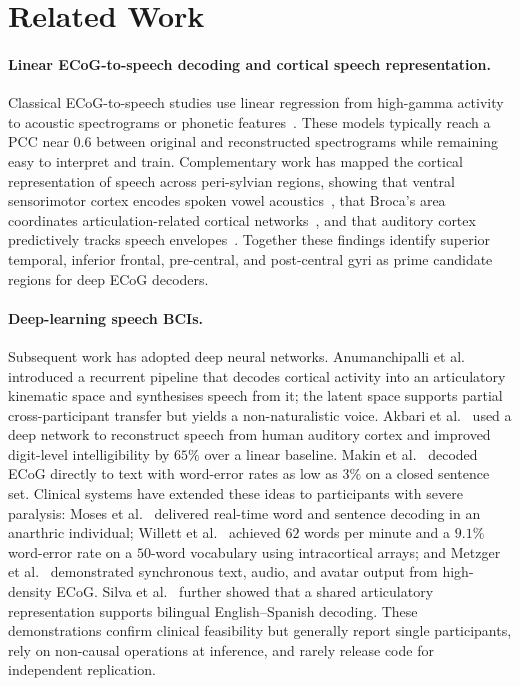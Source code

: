 \documentclass[11pt]{article}
\begin{document}
\section{Related Work}

\paragraph{Linear ECoG-to-speech decoding and cortical speech representation.}
Classical ECoG-to-speech studies use linear regression from high-gamma
activity to acoustic spectrograms or phonetic
features~\cite{pasley2012reconstructing,mugler2014direct,herff2015brain}.
These models typically reach a PCC near $0.6$ between original and
reconstructed spectrograms while remaining easy to interpret and
train. Complementary work has mapped the cortical representation of
speech across peri-sylvian regions, showing that ventral sensorimotor
cortex encodes spoken vowel
acoustics~\cite{bouchard2014control}, that Broca's area coordinates
articulation-related cortical networks~\cite{flinker2015redefining,wang2021dynamics},
and that auditory cortex predictively tracks speech
envelopes~\cite{golumbic2013visual,yildiz2016predictive}. Together these
findings identify superior temporal, inferior frontal, pre-central, and
post-central gyri as prime candidate regions for deep ECoG decoders.

\paragraph{Deep-learning speech BCIs.}
Subsequent work has adopted deep neural networks. Anumanchipalli et
al.~\cite{anumanchipalli2019speech} introduced a recurrent pipeline that
decodes cortical activity into an articulatory kinematic space and
synthesises speech from it; the latent space supports partial
cross-participant transfer but yields a non-naturalistic voice. Akbari et
al.~\cite{akbari2019towards} used a deep network to reconstruct speech
from human auditory cortex and improved digit-level intelligibility by
$65\%$ over a linear baseline. Makin et
al.~\cite{makin2020machine} decoded ECoG directly to text with
word-error rates as low as $3\%$ on a closed sentence set. Clinical
systems have extended these ideas to participants with severe paralysis:
Moses et al.~\cite{moses2021neuroprosthesis} delivered real-time word and
sentence decoding in an anarthric individual; Willett et
al.~\cite{willett2023highperformance} achieved $62$ words per minute and a
$9.1\%$ word-error rate on a $50$-word vocabulary using intracortical
arrays; and Metzger et al.~\cite{metzger2023highperformance} demonstrated
synchronous text, audio, and avatar output from high-density ECoG. Silva
et al.~\cite{silva2024bilingual} further showed that a shared articulatory
representation supports bilingual English--Spanish decoding. These
demonstrations confirm clinical feasibility but generally report single
participants, rely on non-causal operations at inference, and rarely
release code for independent replication.
\end{document}

